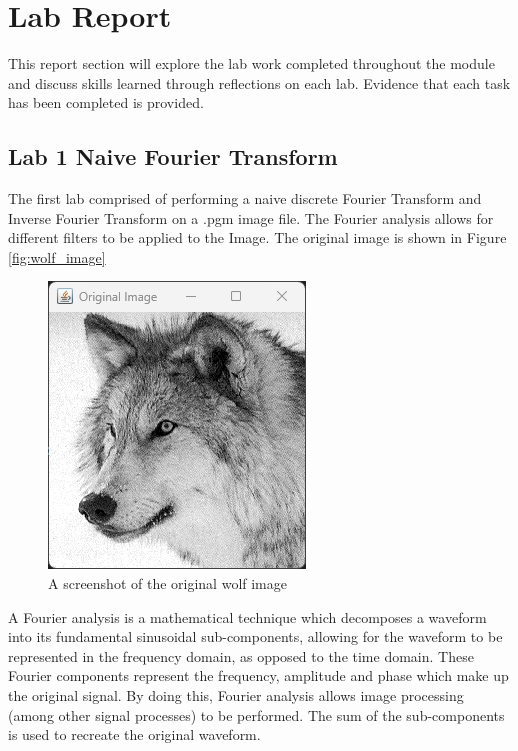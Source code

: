 \chapter{Lab Report}
This report section will explore the lab work completed throughout the module and discuss skills learned through reflections on each lab. Evidence that each task has been completed is provided.

\section{Lab 1 Naive Fourier Transform}

    The first lab comprised of performing a naive discrete Fourier Transform and Inverse Fourier Transform on a .pgm image file. The Fourier analysis allows for different filters to be applied to the Image. The original image is shown in Figure \autoref{fig:wolf_image}

    \begin{figure}[H]
        \centering
            \includegraphics[width=0.8\columnwidth]{Figures/Week 1/W1-Wolf-Original.png}
            \caption{A screenshot of the original wolf image}
            \label{fig:wolf_image}
    \end{figure}
    
    A Fourier analysis is a mathematical technique which decomposes a waveform into its fundamental sinusoidal sub-components, allowing for the waveform to be represented in the frequency domain, as opposed to the time domain. These Fourier components represent the frequency, amplitude and phase which make up the original signal. By doing this, Fourier analysis allows image processing (among other signal processes) to be performed. The sum of the sub-components is used to recreate the original waveform. 
    


